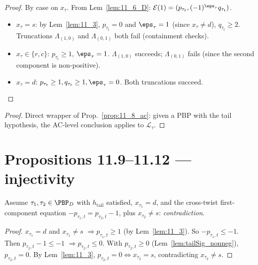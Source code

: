 \begin{proof}
  \leanok
  By case on $x_\tau$. From Lem~\ref{lem:11_6_D}:
  $\mathcal{E}(1) = (p_{\tau_t}, (-1)^{\eps_\tau} q_{\tau_t})$.
  \begin{itemize}
    \item $x_\tau = s$: by Lem~\ref{lem:11_3}, $p_{\tau_t} = 0$ and $\eps_\tau = 1$ (since $x_\tau \neq d$), $q_{\tau_t} \geq 2$. Truncations $\Lambda_{(1, 0)}$ and $\Lambda_{(0, 1)}$ both fail (containment checks).
    \item $x_\tau \in \{r, c\}$: $p_{\tau_t} \geq 1$, $\eps_\tau = 1$. $\Lambda_{(1, 0)}$ succeeds; $\Lambda_{(0, 1)}$ fails (since the second component is non-positive).
    \item $x_\tau = d$: $p_{\tau_t} \geq 1, q_{\tau_t} \geq 1, \eps_\tau = 0$. Both truncations succeed.
  \end{itemize}
\end{proof}

\begin{proposition}
  \label{prop:11_8_pbp}
  \leanok
\end{proposition}
\begin{proof}
  \leanok
  Direct wrapper of Prop.~\ref{prop:11_8_ac}: given a PBP with the tail hypothesis, the AC-level conclusion applies to $\mathcal{L}_\tau$.
\end{proof}


\section{Propositions 11.9--11.12 — injectivity}

\begin{lemma}
  \label{prop:11_9_D}
  \leanok
  Assume $\tau_1, \tau_2 \in \PBP_D$ with $h_{\mathrm{tail}}$ satisfied, $x_{\tau_1} = d$, and the cross-twist first-component equation
  $-p_{\tau_1, t} = p_{\tau_2, t} - 1$, plus $x_{\tau_2} \neq s$: \emph{contradiction}.
\end{lemma}

\begin{proof}
  \leanok
  $x_{\tau_1} = d$ and $x_{\tau_1} \neq s$ $\Rightarrow p_{\tau_1, t} \geq 1$ (by Lem~\ref{lem:11_3}).
  So $-p_{\tau_1, t} \leq -1$.
  Then $p_{\tau_2, t} - 1 \leq -1$ $\Rightarrow p_{\tau_2, t} \leq 0$. With $p_{\tau_2, t} \geq 0$ (Lem~\ref{lem:tailSig_nonneg}), $p_{\tau_2, t} = 0$.
  By Lem~\ref{lem:11_3}, $p_{\tau_2, t} = 0 \iff x_{\tau_2} = s$, contradicting $x_{\tau_2} \neq s$.
\end{proof}

